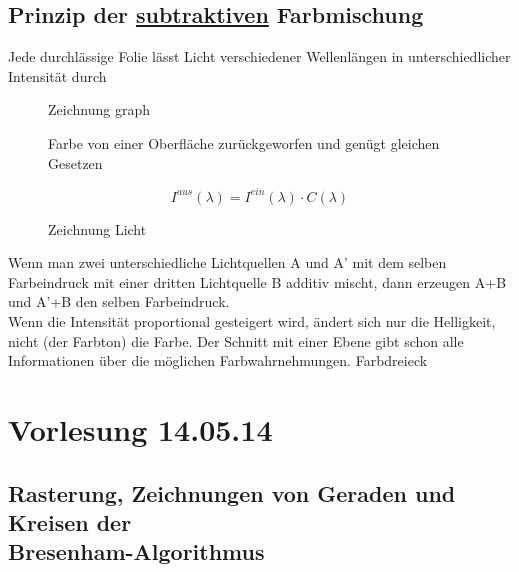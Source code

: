 \documentclass[11pt]{article}
\begin{document}
\subsection{Prinzip der \underline{subtraktiven} Farbmischung}
Jede durchlässige Folie lässt Licht verschiedener Wellenlängen in unterschiedlicher Intensität durch
\begin{figure}
\begin{minipage}[c]{7cm}
\begin{minipage}[c]{7cm}
{\color{red} Zeichnung graph}
\end{minipage}
\vfill
\begin{minipage}[c]{7cm}
Farbe von einer Oberfläche zurückgeworfen und genügt gleichen Gesetzen
\end{minipage}
\end{minipage}
\hfill
\begin{minipage}[c]{7cm}
\begin{minipage}[c]{7cm}
$$ I^{aus}(\lambda) = I^{ein}(\lambda) \cdot C(\lambda)$$
\end{minipage}
\vfill
\begin{minipage}[c]{7cm}
{\color{red} Zeichnung Licht}
\end{minipage}
\end{minipage}
\end{figure}
Wenn man zwei unterschiedliche Lichtquellen A und A' mit dem selben Farbeindruck mit einer dritten Lichtquelle B additiv mischt, dann erzeugen A+B und A'+B den selben Farbeindruck.\\
Wenn die Intensität proportional gesteigert wird, ändert sich nur die Helligkeit, nicht (der Farbton) die Farbe. Der Schnitt mit einer Ebene gibt schon alle Informationen über die möglichen Farbwahrnehmungen.
{\color{red}Farbdreieck}
\section{Vorlesung 14.05.14}
\subsection{Rasterung, Zeichnungen von Geraden und Kreisen der \\Bresenham-Algorithmus}
\end{document}
